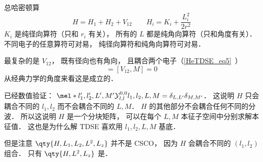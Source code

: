 
总哈密顿算
\begin{equation}
H = H_1 + H_2 + V_{12} \qquad H_i = K_i + \frac{L_i^2}{2r^2}
\end{equation}
$K_i$ 是纯径向算符（只和 $r_i$ 有关）， 所有的 $L$ 都是纯角向算符（只和角度有关）． 不同电子的任意算符可对易， 纯径向算符和纯角向算符可对易．

最复杂的是 $V_{12}$， 既有径向也有角向， 且耦合两个电子（\autoref{HeTDSE_eq5}~）
\begin{equation}
[V_{12}, L^2] = [V_{12}, M] = 0
\end{equation}
从经典力学的角度来看这是成立的．

已经数值验证： $\mel*{l'_1,l'_2,L',M'}{\mathcal Y_{l,l}^{0,0}}{l_1,l_2,L,M} = \delta_{L,L'}\delta_{M,M'}$． 这说明 $H$ 只会耦合不同的 $l_1,l_2$ 而不会耦合不同的 $L,M$． $H$ 的其他部分不会耦合任何不同的分波． 所以这说明 $H$ 是一个分块矩阵， 可以在每个 $L,M$ 本征子空间中分别求解本征值． 这也是为什么解 TDSE 喜欢用 $l_1,l_2,L,M$ 基底．

但是注意 $\qty{H,L_1,L_2,L^2,L_z}$ 并不是 CSCO， 因为 $H$ 会耦合不同的 $(l_1,l_2)$ 组合． 只有 $\qty{H,L^2,L_z}$ 是．
